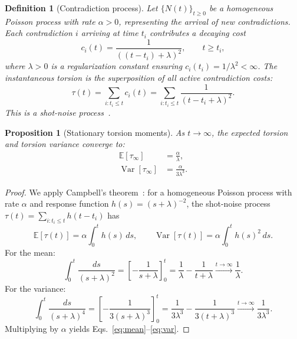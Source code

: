 \documentclass[11pt]{article}
\theoremstyle{plain}
\newtheorem{definition}{Definition}[section]
\newtheorem{proposition}{Proposition}[section]
\begin{document}
\begin{definition}[Contradiction process]
Let $\{N(t)\}_{t \geq 0}$ be a homogeneous Poisson process with rate $\alpha > 0$, representing the
arrival of new contradictions. Each contradiction $i$ arriving at time $t_i$ contributes a decaying
cost
\[
  c_i(t) = \frac{1}{((t - t_i) + \lambda)^2}, \qquad t \geq t_i,
\]
where $\lambda > 0$ is a regularization constant ensuring $c_i(t_i) = 1/\lambda^2 < \infty$. The
instantaneous torsion is the superposition of all active contradiction costs:
\begin{equation}\label{eq:shotnoise}
  \tau(t) = \sum_{i : t_i \leq t} c_i(t) = \sum_{i : t_i \leq t} \frac{1}{(t - t_i + \lambda)^2}.
\end{equation}
This is a shot-noise process~\cite{daley2003}.
\end{definition}

\begin{proposition}[Stationary torsion moments]\label{prop:moments}
As $t \to \infty$, the expected torsion and torsion variance converge to:
\begin{align}
  \mathbb{E}[\tau_\infty] &= \frac{\alpha}{\lambda}, \label{eq:mean} \\
  \operatorname{Var}[\tau_\infty] &= \frac{\alpha}{3\lambda^3}. \label{eq:var}
\end{align}
\end{proposition}

\begin{proof}
We apply Campbell's theorem~\cite{kingman1993}: for a homogeneous Poisson process with rate
$\alpha$ and response function $h(s) = (s + \lambda)^{-2}$, the shot-noise process
$\tau(t) = \sum_{i : t_i \leq t} h(t - t_i)$ has
\[
  \mathbb{E}[\tau(t)] = \alpha \int_0^t h(s)\, ds, \qquad
  \operatorname{Var}[\tau(t)] = \alpha \int_0^t h(s)^2\, ds.
\]
For the mean:
\[
  \int_0^t \frac{ds}{(s + \lambda)^2}
  = \left[ -\frac{1}{s + \lambda} \right]_0^t
  = \frac{1}{\lambda} - \frac{1}{t + \lambda}
  \xrightarrow{t \to \infty} \frac{1}{\lambda}.
\]
For the variance:
\[
  \int_0^t \frac{ds}{(s + \lambda)^4}
  = \left[ -\frac{1}{3(s + \lambda)^3} \right]_0^t
  = \frac{1}{3\lambda^3} - \frac{1}{3(t + \lambda)^3}
  \xrightarrow{t \to \infty} \frac{1}{3\lambda^3}.
\]
Multiplying by $\alpha$ yields Eqs.~\eqref{eq:mean}--\eqref{eq:var}.
\end{proof}
\end{document}
